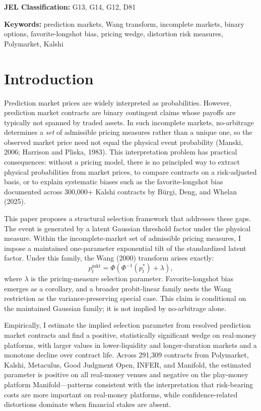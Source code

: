 \documentclass[12pt,a4paper]{article}
\begin{document}
\noindent\small\textbf{JEL Classification:} G13, G14, G12, D81
\vspace{2pt}

\noindent\small\textbf{Keywords:} prediction markets, Wang transform,
incomplete markets, binary options, favorite-longshot bias, pricing
wedge, distortion risk measures, Polymarket, Kalshi

\section{Introduction}\label{introduction}

Prediction market prices are widely interpreted as probabilities. However, prediction market contracts are binary contingent claims whose payoffs are typically not spanned by traded assets. In such incomplete markets, no-arbitrage determines a \emph{set} of admissible pricing measures rather than a unique one, so the observed market price need not equal the physical event probability (Manski, 2006; Harrison and Pliska, 1983). This interpretation problem has practical consequences: without a pricing model, there is no principled way to extract physical probabilities from market prices, to compare contracts on a risk-adjusted basis, or to explain systematic biases such as the favorite-longshot bias documented across 300,000+ Kalshi contracts by Bürgi, Deng, and Whelan (2025).

This paper proposes a structural selection framework that addresses these gaps. The event is generated by a latent Gaussian threshold factor under the physical measure. Within the incomplete-market set of admissible pricing measures, I impose a maintained one-parameter exponential tilt of the standardized latent factor. Under this family, the Wang (2000) transform arises exactly:
\[
p_t^{\mathrm{mkt}}=\Phi\!\left(\Phi^{-1}(p_t^*)+\lambda\right),
\]
where $\lambda$ is the pricing-measure selection parameter. Favorite-longshot bias emerges as a corollary, and a broader probit-linear family nests the Wang restriction as the variance-preserving special case. This claim is conditional on the maintained Gaussian family; it is not implied by no-arbitrage alone.

Empirically, I estimate the implied selection parameter from resolved prediction market contracts and find a positive, statistically significant wedge on real-money platforms, with larger values in lower-liquidity and longer-duration markets and a monotone decline over contract life. Across 291,309 contracts from Polymarket, Kalshi, Metaculus, Good Judgment Open, INFER, and Manifold, the estimated parameter is positive on all real-money venues and negative on the play-money platform Manifold---patterns consistent with the interpretation that risk-bearing costs are more important on real-money platforms, while confidence-related distortions dominate when financial stakes are absent.
\end{document}
